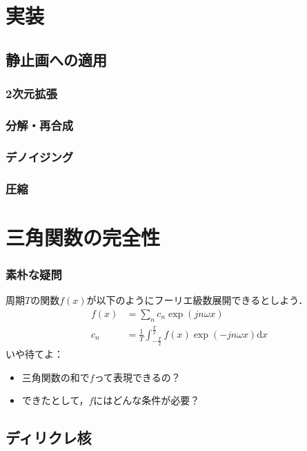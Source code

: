 \documentclass[dvipdfmx,graphicx,14pt]{beamer}
\begin{document}
\section{実装}

\subsection{静止画への適用}
\subsubsection{2次元拡張}
\subsubsection{分解・再合成}
\subsubsection{デノイジング}
\subsubsection{圧縮}

\appendix
\setcounter{section}{0}
\renewcommand\insertsectionnumber{\Alph{section}}

\section{三角関数の完全性}

\begin{frame}[c]
    \frametitle{素朴な疑問}
    周期$T$の関数$f(x)$が以下のようにフーリエ級数展開できるとしよう．
    \begin{align*}
        f(x) &= \sum_{n} c_{n} \exp(jn\omega x) \\
        c_{n} &= \frac{1}{T} \int_{-\frac{T}{2}}^{\frac{T}{2}} f(x) \exp(-jn\omega x) \mathrm{d} x
    \end{align*}
    いや待てよ：
    \begin{itemize}
        \item 三角関数の和で$f$って表現できるの？
        \item できたとして，$f$にはどんな条件が必要？
    \end{itemize}
\end{frame}

\subsection{ディリクレ核}
\end{document}

